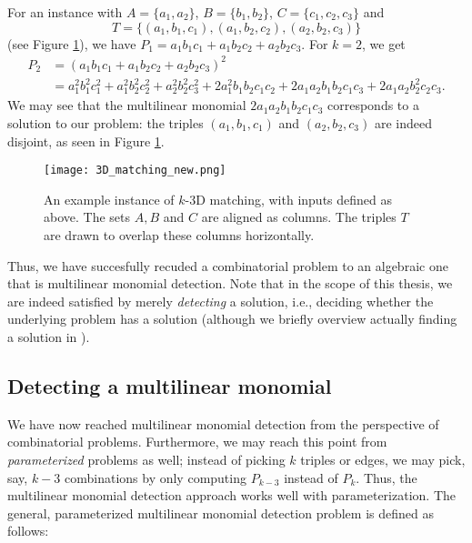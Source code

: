 For an instance with $A = \{a_1, a_2\}$, $B = \{b_1, b_2\}$, $C = \{c_1, c_2,
c_3\}$ and 
\[
  T = \{(a_1, b_1, c_1), (a_1, b_2, c_2), (a_2, b_2, c_3)\}
\]
(see Figure \ref{fig:3D_matching}), 
we have $P_1 = a_1b_1c_1 + a_1b_2c_2 + a_2b_2c_3$. For $k=2$, we get 
\begin{align*}
  P_2 &= (a_1b_1c_1 + a_1b_2c_2 + a_2b_2c_3)^2 \\
  &= a_1^2b_1^2c_1^2 + a_1^2b_2^2c_2^2 + a_2^2b_2^2c_3^2 + 
  2a_1^2b_1b_2c_1c_2 + 2a_1a_2b_1b_2c_1c_3 + 2 a_1a_2b_2^2c_2c_3.
\end{align*}
We may see that the multilinear monomial $2a_1a_2b_1b_2c_1c_3$ corresponds 
to a solution to our problem: the triples $(a_1,b_1,c_1)$ and $(a_2,b_2,c_3)$ are 
indeed disjoint, as seen in Figure \ref{fig:3D_matching}.
%
\begin{figure}[!h]
  \texttt{[image: 3D\_matching\_new.png]}
  \centering
  \caption{An example instance of $k$-3D matching, with inputs defined 
  as above. The sets $A, B$ and $C$ are aligned as columns. 
  The triples $T$ are drawn to overlap these columns horizontally.}
  \label{fig:3D_matching}
\end{figure}

Thus, we have succesfully recuded a combinatorial problem to an 
algebraic one that is multilinear monomial detection. 
Note that in the scope of this thesis, we 
are indeed satisfied by merely \emph{detecting} a solution, i.e., deciding whether 
the underlying problem has a solution (although we briefly overview 
actually finding a solution in ).

\FloatBarrier
\subsection{Detecting a multilinear monomial}
\label{sect:problem_definition}

We have now reached multilinear monomial detection from the perspective 
of combinatorial problems. Furthermore, we may reach this point from 
\emph{parameterized} problems as well; instead of picking $k$ triples or edges, 
we may pick, say, $k-3$ combinations by only computing $P_{k-3}$ instead of $P_k$. 
Thus, the multilinear monomial detection approach works well with parameterization. 
The general, parameterized multilinear monomial detection problem is defined as follows: 

\begin{problem}
\end{problem}

